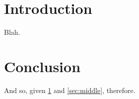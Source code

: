 \documentclass{article}
\begin{document}
\section{Introduction}\label{sec:intro}
Blah.

\section{Conclusion}\label{sec:conclusion}
And so, given \ref{sec:intro} and \ref{sec:middle},
therefore.
\end{document}
